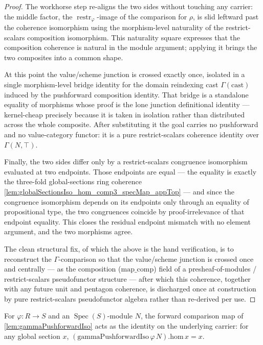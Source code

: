 \begin{proof}
  The workhorse step re-aligns the two sides without touching any carrier: the middle
  factor, the \(\operatorname{restr}_\varphi\)-image of the comparison for \(\rho\), is
  slid leftward past the coherence isomorphism using the morphism-level naturality of the
  restrict-scalars composition isomorphism. This naturality square expresses that the
  composition coherence is natural in the module argument; applying it brings the two
  composites into a common shape.

  At this point the value/scheme junction is crossed exactly once, isolated in a single
  morphism-level bridge identity for the domain reindexing cast \(\Gamma(\text{cast})\)
  induced by the pushforward composition identity. That bridge is a standalone equality of
  morphisms whose proof is the lone junction definitional identity — kernel-cheap precisely
  because it is taken in isolation rather than distributed across the whole composite.
  After substituting it the goal carries no pushforward and no value-category functor: it
  is a pure restrict-scalars coherence identity over \(\Gamma(N,\top)\).

  Finally, the two sides differ only by a restrict-scalars congruence isomorphism evaluated
  at two endpoints. Those endpoints are equal — the equality is exactly the three-fold
  global-sections ring coherence \cref{lem:globalSectionsIso_hom_comp3_specMap_appTop} — and
  since the congruence isomorphism depends on its endpoints only through an equality of
  propositional type, the two congruences coincide by proof-irrelevance of that endpoint
  equality. This closes the residual endpoint mismatch with no element argument, and the
  two morphisms agree.

  The clean structural fix, of which the above is the hand verification, is to reconstruct
  the \(\Gamma\)-comparison so that the value/scheme junction is crossed once and centrally
  — as the composition (\(\mathrm{map\_comp}\)) field of a presheaf-of-modules /
  restrict-scalars pseudofunctor structure — after which this coherence, together with any
  future unit and pentagon coherence, is discharged once at construction by pure
  restrict-scalars pseudofunctor algebra rather than re-derived per use.
\end{proof}

\begin{lemma}



  \label{lem:gammaPushforwardIso_hom_apply}
  For \(\varphi : R \to S\) and an \(\operatorname{Spec}(S)\)-module \(N\), the forward
  comparison map of \cref{lem:gammaPushforwardIso} acts as the identity on the underlying
  carrier: for any global section \(x\), \((\mathrm{gammaPushforwardIso}\,\varphi\,N).\mathrm{hom}\,x = x\).
\end{lemma}

